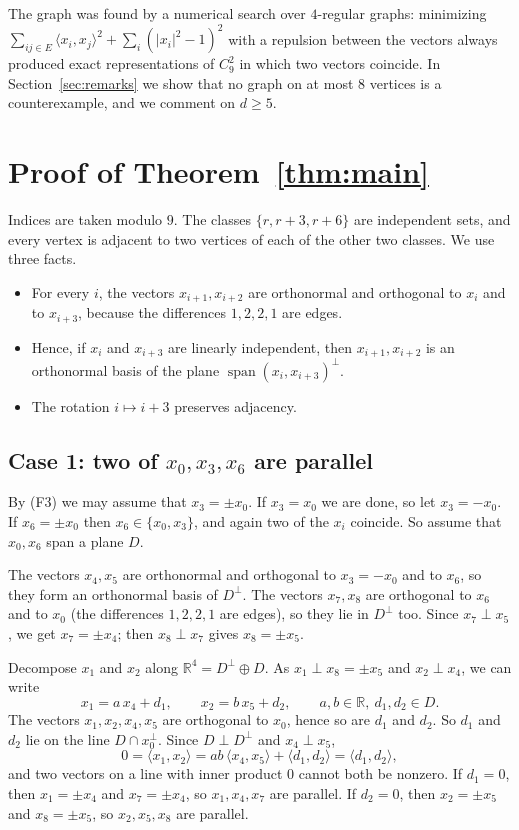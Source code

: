 \documentclass[11pt]{amsart}
\theoremstyle{definition}
\theoremstyle{remark}
\newcommand{\R}{\mathbb{R}}
\newcommand{\ip}[2]{\langle #1,#2\rangle}
\begin{document}
The graph was found by a numerical search over $4$-regular graphs: minimizing $\sum_{ij\in E}\ip{x_i}{x_j}^2+\sum_i(|x_i|^2-1)^2$ with a repulsion between the vectors always produced exact representations of $C_9^2$ in which two vectors coincide.
In Section~\ref{sec:remarks} we show that no graph on at most $8$ vertices is a counterexample, and we comment on $d\ge5$.

\section{Proof of Theorem~\ref{thm:main}}

Indices are taken modulo $9$.
The classes $\{r,r+3,r+6\}$ are independent sets, and every vertex is adjacent to two vertices of each of the other two classes.
We use three facts.
\begin{itemize}
\item[(F1)] For every $i$, the vectors $x_{i+1},x_{i+2}$ are orthonormal and orthogonal to $x_i$ and to $x_{i+3}$, because the differences $1,2,2,1$ are edges.
\item[(F2)] Hence, if $x_i$ and $x_{i+3}$ are linearly independent, then $x_{i+1},x_{i+2}$ is an orthonormal basis of the plane $\operatorname{span}(x_i,x_{i+3})^{\perp}$.
\item[(F3)] The rotation $i\mapsto i+3$ preserves adjacency.
\end{itemize}

\subsection*{Case 1: two of $x_0,x_3,x_6$ are parallel}
By (F3) we may assume that $x_3=\pm x_0$.
If $x_3=x_0$ we are done, so let $x_3=-x_0$.
If $x_6=\pm x_0$ then $x_6\in\{x_0,x_3\}$, and again two of the $x_i$ coincide.
So assume that $x_0,x_6$ span a plane $D$.

The vectors $x_4,x_5$ are orthonormal and orthogonal to $x_3=-x_0$ and to $x_6$, so they form an orthonormal basis of $D^\perp$.
The vectors $x_7,x_8$ are orthogonal to $x_6$ and to $x_0$ (the differences $1,2,2,1$ are edges), so they lie in $D^\perp$ too.
Since $x_7\perp x_5$, we get $x_7=\pm x_4$; then $x_8\perp x_7$ gives $x_8=\pm x_5$.

Decompose $x_1$ and $x_2$ along $\R^4=D^\perp\oplus D$.
As $x_1\perp x_8=\pm x_5$ and $x_2\perp x_4$, we can write
\[
x_1=a\,x_4+d_1,\qquad x_2=b\,x_5+d_2,\qquad a,b\in\R,\ d_1,d_2\in D.
\]
The vectors $x_1,x_2,x_4,x_5$ are orthogonal to $x_0$, hence so are $d_1$ and $d_2$.
So $d_1$ and $d_2$ lie on the line $D\cap x_0^\perp$.
Since $D\perp D^\perp$ and $x_4\perp x_5$,
\[
0=\ip{x_1}{x_2}=ab\,\ip{x_4}{x_5}+\ip{d_1}{d_2}=\ip{d_1}{d_2},
\]
and two vectors on a line with inner product $0$ cannot both be nonzero.
If $d_1=0$, then $x_1=\pm x_4$ and $x_7=\pm x_4$, so $x_1,x_4,x_7$ are parallel.
If $d_2=0$, then $x_2=\pm x_5$ and $x_8=\pm x_5$, so $x_2,x_5,x_8$ are parallel.
\end{document}
